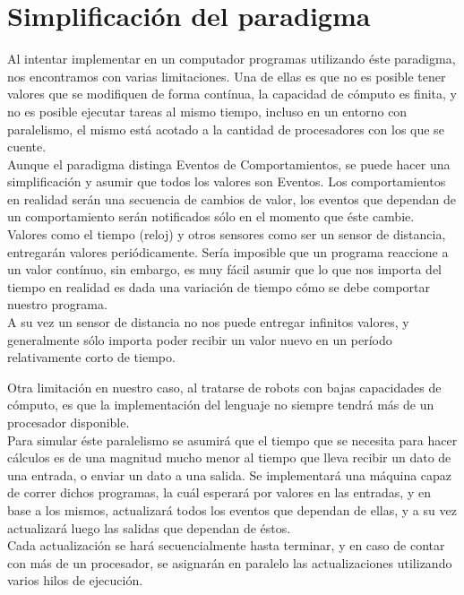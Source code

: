 
\section{Simplificación del paradigma}

  Al intentar implementar en un computador programas utilizando éste paradigma, nos encontramos
con varias limitaciones.
  Una de ellas es que no es posible tener valores que se modifiquen de forma contínua, la capacidad
de cómputo es finita, y no es posible ejecutar tareas al mismo tiempo, incluso en un entorno con
paralelismo, el mismo está acotado a la cantidad de procesadores con los que se cuente.\\

  Aunque el paradigma distinga Eventos de Comportamientos, se puede hacer una simplificación y
asumir que todos los valores son Eventos. Los comportamientos en realidad serán una secuencia de
cambios de valor, los eventos que dependan de un comportamiento serán notificados sólo en el momento
que éste cambie.\\
  Valores como el tiempo (reloj) y otros sensores como ser un sensor de distancia, entregarán valores
periódicamente. Sería imposible que un programa reaccione a un valor contínuo, sin embargo, es muy fácil
asumir que lo que nos importa del tiempo en realidad es dada una variación de tiempo cómo se debe
comportar nuestro programa.\\
  A su vez un sensor de distancia no nos puede entregar infinitos valores, y generalmente sólo importa
poder recibir un valor nuevo en un período relativamente corto de tiempo.

  Otra limitación en nuestro caso, al tratarse de robots con bajas capacidades de cómputo, es que
la implementación del lenguaje no siempre tendrá más de un procesador disponible.\\
  Para simular éste paralelismo se asumirá que el tiempo que se necesita para hacer cálculos es de
una magnitud mucho menor al tiempo que lleva recibir un dato de una entrada, o enviar un dato a una salida.
  Se implementará una máquina capaz de correr dichos programas, la cuál esperará por valores en las entradas,
y en base a los mismos, actualizará todos los eventos que dependan de ellas, y a su vez actualizará luego
las salidas que dependan de éstos.\\
  Cada actualización se hará secuencialmente hasta terminar, y en caso de contar con más de un procesador, se
asignarán en paralelo las actualizaciones utilizando varios hilos de ejecución.\\


